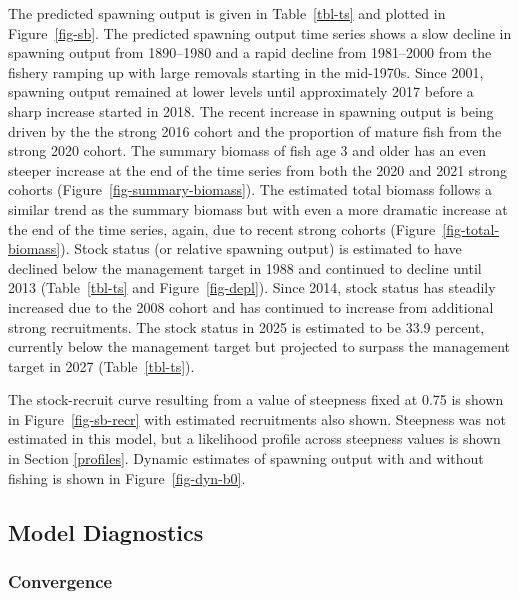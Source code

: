 \documentclass[
  english,
]{article}
\begin{document}
The predicted spawning output is given in Table~\ref{tbl-ts} and plotted
in Figure~\ref{fig-sb}. The predicted spawning output time series shows
a slow decline in spawning output from 1890--1980 and a rapid decline
from 1981--2000 from the fishery ramping up with large removals starting
in the mid-1970s. Since 2001, spawning output remained at lower levels
until approximately 2017 before a sharp increase started in 2018. The
recent increase in spawning output is being driven by the the strong
2016 cohort and the proportion of mature fish from the strong 2020
cohort. The summary biomass of fish age 3 and older has an even steeper
increase at the end of the time series from both the 2020 and 2021
strong cohorts (Figure~\ref{fig-summary-biomass}). The estimated total
biomass follows a similar trend as the summary biomass but with even a
more dramatic increase at the end of the time series, again, due to
recent strong cohorts (Figure~\ref{fig-total-biomass}). Stock status (or
relative spawning output) is estimated to have declined below the
management target in 1988 and continued to decline until 2013
(Table~\ref{tbl-ts} and Figure~\ref{fig-depl}). Since 2014, stock status
has steadily increased due to the 2008 cohort and has continued to
increase from additional strong recruitments. The stock status in 2025
is estimated to be 33.9 percent, currently below the management target
but projected to surpass the management target in 2027
(Table~\ref{tbl-ts}).

The stock-recruit curve resulting from a value of steepness fixed at
0.75 is shown in Figure~\ref{fig-sb-recr} with estimated recruitments
also shown. Steepness was not estimated in this model, but a likelihood
profile across steepness values is shown in Section \ref{profiles}.
Dynamic estimates of spawning output with and without fishing is shown
in Figure~\ref{fig-dyn-b0}.

\subsection{Model Diagnostics}\label{model-diagnostics}

\subsubsection{Convergence}\label{convergence}
\end{document}
